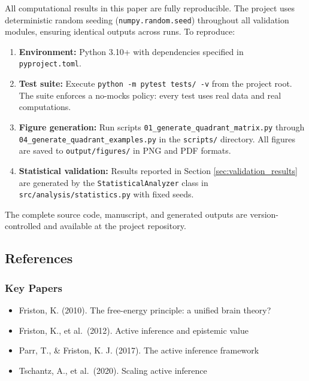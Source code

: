 \documentclass[
]{article}
\providecommand{\tightlist}{%
  \setlength{\itemsep}{0pt}\setlength{\parskip}{0pt}}
\begin{document}
All computational results in this paper are fully reproducible. The
project uses deterministic random seeding (\texttt{numpy.random.seed})
throughout all validation modules, ensuring identical outputs across
runs. To reproduce:

\begin{enumerate}
\def\labelenumi{\arabic{enumi}.}
\tightlist
\item
  \textbf{Environment:} Python 3.10+ with dependencies specified in
  \texttt{pyproject.toml}.
\item
  \textbf{Test suite:} Execute \texttt{python\ -m\ pytest\ tests/\ -v}
  from the project root. The suite enforces a no-mocks policy: every
  test uses real data and real computations.
\item
  \textbf{Figure generation:} Run scripts
  \texttt{01\_generate\_quadrant\_matrix.py} through
  \texttt{04\_generate\_quadrant\_examples.py} in the \texttt{scripts/}
  directory. All figures are saved to \texttt{output/figures/} in PNG
  and PDF formats.
\item
  \textbf{Statistical validation:} Results reported in Section
  \ref{sec:validation_results} are generated by the
  \texttt{StatisticalAnalyzer} class in
  \texttt{src/analysis/statistics.py} with fixed seeds.
\end{enumerate}

The complete source code, manuscript, and generated outputs are
version-controlled and available at the project repository.

\subsection{References}\label{sec:references_appendix}

\subsubsection{Key Papers}\label{key-papers}

\begin{itemize}
\tightlist
\item
  Friston, K. (2010). The free-energy principle: a unified brain theory?
\item
  Friston, K., et al.~(2012). Active inference and epistemic value
\item
  Parr, T., \& Friston, K. J. (2017). The active inference framework
\item
  Tschantz, A., et al.~(2020). Scaling active inference
\end{itemize}
\end{document}
